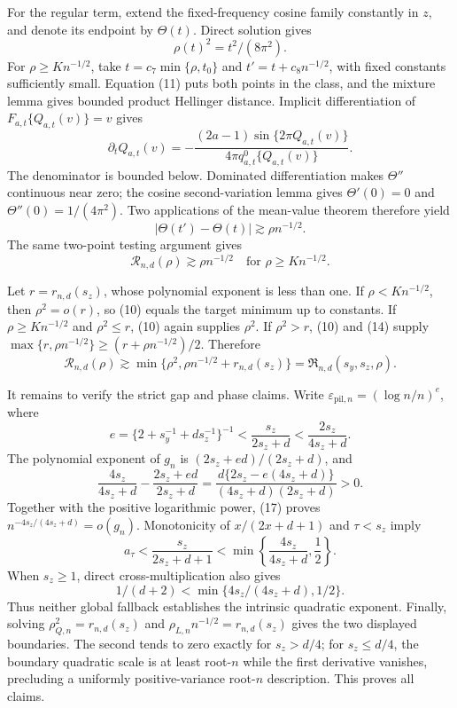 For the regular term, extend the fixed-frequency cosine family constantly in \(z\), and denote its endpoint by \(\Theta(t)\).  Direct solution gives
\[
\rho(t)^2=t^2/(8\pi^2). \tag{11}
\]
For \(\rho\ge K n^{-1/2}\), take \(t=c_7\min\{\rho,t_0\}\) and \(t'=t+c_8n^{-1/2}\), with fixed constants sufficiently small.  Equation (11) puts both points in the class, and the mixture lemma gives bounded product Hellinger distance.  Implicit differentiation of \(F_{a,t}\{Q_{a,t}(v)\}=v\) gives
\[
\partial_tQ_{a,t}(v)
=-\frac{(2a-1)\sin\{2\pi Q_{a,t}(v)\}}
{4\pi q_{a,t}^{0}\{Q_{a,t}(v)\}}. \tag{12}
\]
The denominator is bounded below.  Dominated differentiation makes \(\Theta''\) continuous near zero; the cosine second-variation lemma gives \(\Theta'(0)=0\) and \(\Theta''(0)=1/(4\pi^2)\).  Two applications of the mean-value theorem therefore yield
\[
|\Theta(t')-\Theta(t)|\gtrsim\rho n^{-1/2}. \tag{13}
\]
The same two-point testing argument gives
\[
\mathcal R_{n,d}(\rho)\gtrsim\rho n^{-1/2}
\quad\text{for }\rho\ge K n^{-1/2}. \tag{14}
\]

Let \(r=r_{n,d}(s_z)\), whose polynomial exponent is less than one.  If \(\rho<K n^{-1/2}\), then \(\rho^2=o(r)\), so (10) equals the target minimum up to constants.  If \(\rho\ge K n^{-1/2}\) and \(\rho^2\le r\), (10) again supplies \(\rho^2\).  If \(\rho^2>r\), (10) and (14) supply \(\max\{r,\rho n^{-1/2}\}\ge(r+\rho n^{-1/2})/2\).  Therefore
\[
\mathcal R_{n,d}(\rho)\gtrsim
\min\{\rho^2,\rho n^{-1/2}+r_{n,d}(s_z)\}
=\mathfrak R_{n,d}(s_y,s_z,\rho). \tag{15}
\]

It remains to verify the strict gap and phase claims.  Write \(\varepsilon_{\mathrm{pil},n}=(\log n/n)^e\), where
\[
e=\{2+s_y^{-1}+ds_z^{-1}\}^{-1}
<\frac{s_z}{2s_z+d}<\frac{2s_z}{4s_z+d}. \tag{16}
\]
The polynomial exponent of \(g_n\) is \((2s_z+ed)/(2s_z+d)\), and
\[
\frac{4s_z}{4s_z+d}-\frac{2s_z+ed}{2s_z+d}
=\frac{d\{2s_z-e(4s_z+d)\}}{(4s_z+d)(2s_z+d)}>0. \tag{17}
\]
Together with the positive logarithmic power, (17) proves \(n^{-4s_z/(4s_z+d)}=o(g_n)\).  Monotonicity of \(x/(2x+d+1)\) and \(\tau<s_z\) imply
\[
a_\tau<\frac{s_z}{2s_z+d+1}<
\min\left\{\frac{4s_z}{4s_z+d},\frac12\right\}. \tag{18}
\]
When \(s_z\ge1\), direct cross-multiplication also gives
\[
1/(d+2)<\min\{4s_z/(4s_z+d),1/2\}. \tag{19}
\]
Thus neither global fallback establishes the intrinsic quadratic exponent.  Finally, solving \(\rho_{Q,n}^2=r_{n,d}(s_z)\) and \(\rho_{L,n}n^{-1/2}=r_{n,d}(s_z)\) gives the two displayed boundaries.  The second tends to zero exactly for \(s_z>d/4\); for \(s_z\le d/4\), the boundary quadratic scale is at least root-\(n\) while the first derivative vanishes, precluding a uniformly positive-variance root-\(n\) description.  This proves all claims.
